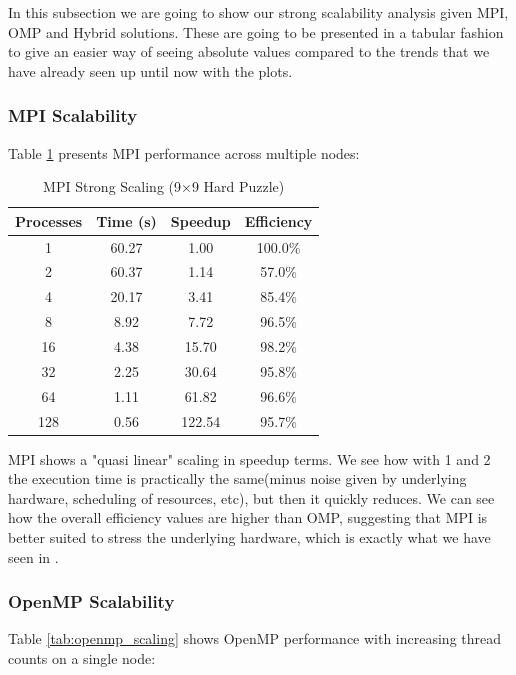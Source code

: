 In this subsection we are going to show our strong scalability analysis given MPI, OMP and Hybrid solutions. These are going to be presented in a tabular fashion to give an easier way of seeing absolute values compared to the trends that we have already seen up until now with the plots.

\subsubsection{MPI Scalability}
\label{subsubsec:mpi_scalability}
Table \ref{tab:mpi_scaling} presents MPI performance across multiple nodes:

\begin{table}[htbp]
\caption{MPI Strong Scaling (9×9 Hard Puzzle)}
\begin{center}
\begin{tabular}{@{}cccc@{}}
\toprule
\textbf{Processes} & \textbf{Time (s)} & \textbf{Speedup} & \textbf{Efficiency} \\
\midrule
1   & 60.27 & 1.00   & 100.0\% \\
2   & 60.37 & 1.14   & 57.0\% \\
4   & 20.17 & 3.41   & 85.4\% \\
8   & 8.92  & 7.72   & 96.5\% \\
16  & 4.38  & 15.70  & 98.2\% \\
32  & 2.25  & 30.64  & 95.8\% \\
64  & 1.11  & 61.82  & 96.6\% \\
128 & 0.56  & 122.54 & 95.7\% \\
\bottomrule
\end{tabular}
\end{center}
\label{tab:mpi_scaling}
\end{table}


MPI shows a "quasi linear" scaling in speedup terms. We see how with 1 and 2 the execution time is practically the same(minus noise given by underlying hardware, scheduling of resources, etc), but then it quickly reduces. We can see how the overall efficiency values are higher than OMP, suggesting that MPI is better suited to stress the underlying hardware, which is exactly what we have seen in .

\subsubsection{OpenMP Scalability}
\label{subsubsec:omp_scalability}
Table \ref{tab:openmp_scaling} shows OpenMP performance with increasing thread counts on a single node:

